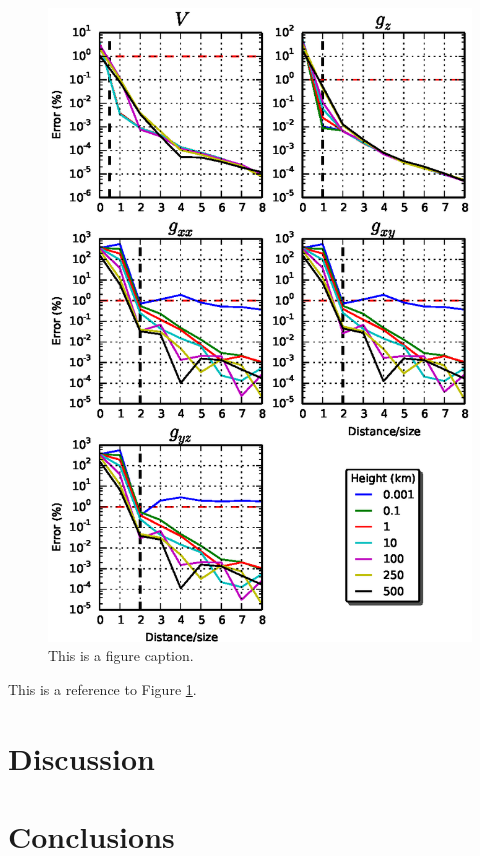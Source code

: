 \documentclass[paper,twocolumn,twoside]{geophysics}
\begin{document}
\begin{figure}
    \centering
    \includegraphics[width=\columnwidth]{figs/error-20deg}
    \caption{This is a figure caption.}
    \label{fig:error20}
\end{figure}

This is a reference to Figure \ref{fig:error20}.




\section{Discussion}

\section{Conclusions}
\end{document}
